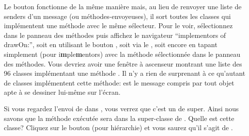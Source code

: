 \documentclass[a4paper,10pt,twoside]{book}
\begin{document}
Le bouton  fonctionne de la m\^eme mani\`ere mais,
au lieu de renvoyer une liste de senders d'un message (ou m\'ethodes-envoyeuses), il sort toutes les
classes qui impl\'ementent une m\'ethode avec le m\^eme s\'electeur.
Pour le voir, s\'electionnez  dans le panneau des m\'ethodes
puis affichez le navigateur ``implementors of drawOn:'', 
soit en utilisant le bouton , soit via le 
, soit encore en tapant simplement  (pour {i\textbf{m}ple\textbf{m}entors}) avec la m\'ethode  s\'electionn\'ee dans le panneau des m\'ethodes. 
Vous devriez avoir une fen\^etre \`a ascenseur montrant une liste des 96
classes impl\'ementant une m\'ethode .
Il n'y a rien de surprenant \`a ce qu'autant de classes impl\'ementent cette
m\'ethode:  est le message compris par tout objet apte \`a se
dessiner lui-m\^eme sur l'\'ecran.


Si vous regardez l'envoi de  dans , vous
verrez que c'est un  de super. Ainsi nous
savons que la m\'ethode ex\'ecut\'ee sera dans la super-classe de . Quelle est cette classe? Cliquez sur le bouton  (pour hi\'erarchie) et vous saurez qu'il s'agit de .
\end{document}
